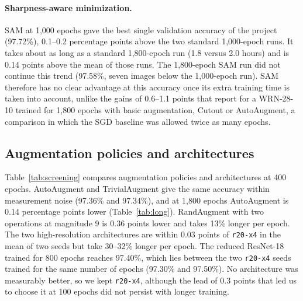 \documentclass[letterpaper]{article}
\begin{document}
\paragraph{Sharpness-aware minimization.} SAM at 1,000 epochs gave the best single validation accuracy of the project (97.72\%),
0.1--0.2 percentage points above the two standard 1,000-epoch runs. It takes about as long as a standard 1,800-epoch run (1.8
versus 2.0 hours) and is 0.14 points above the mean of those runs. The 1,800-epoch SAM run did not continue this trend
(97.58\%, seven images below the 1,000-epoch run). SAM therefore has no clear advantage at this accuracy once its extra training time is taken into account, unlike the gains of 0.6--1.1 points that
\citeauthor{foret2021sharpness} report for a WRN-28-10 trained for 1,800 epochs with basic augmentation, Cutout or AutoAugment, a
comparison in which the SGD baseline was allowed twice as many epochs.

\subsection{Augmentation policies and architectures}
\label{sec:screening}
Table~\ref{tab:screening} compares augmentation policies and architectures at 400 epochs. AutoAugment \cite{cubuk2019autoaugment}
and TrivialAugment give the same accuracy within measurement noise (97.36\% and 97.34\%), and at 1,800 epochs AutoAugment is 0.14 percentage
points lower (Table~\ref{tab:long}). RandAugment \cite{cubuk2020randaugment} with two operations at magnitude 9 is 0.36 points
lower and takes 13\% longer per epoch. The two high-resolution architectures are within 0.03 points of \texttt{r20-x4} in the mean of two seeds but take 30--32\%
longer per epoch. The reduced ResNet-18 trained for 800 epochs reaches 97.40\%, which lies between the two \texttt{r20-x4} seeds
trained for the same number of epochs (97.30\% and 97.50\%). No architecture was measurably better, so we kept \texttt{r20-x4},
although the lead of 0.3 points that led us to choose it at 100 epochs did not persist with longer training.
\end{document}
